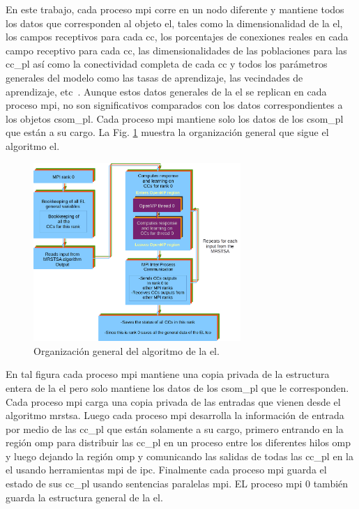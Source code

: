 {En este trabajo, cada proceso \gls{mpi} corre en un nodo diferente y mantiene todos los datos que corresponden al objeto \gls{el}, tales como la dimensionalidad de la \gls{el}, los campos receptivos para cada \gls{cc}, los porcentajes de conexiones reales en cada campo receptivo para cada \gls{cc}, las dimensionalidades de las poblaciones para las \gls{cc_pl} así como la conectividad completa de cada \gls{cc} y todos los parámetros generales del modelo como las tasas de aprendizaje, las vecindades de aprendizaje, etc~\cite{10.1371/journal.pone.0217966}.
Aunque estos datos generales de la \gls{el} se replican en cada proceso \gls{mpi}, no son significativos comparados con los datos correspondientes a los objetos \gls{csom_pl}.
Cada proceso \gls{mpi} mantiene solo los datos de los \gls{csom_pl} que están a su cargo.
La Fig. \ref{fig:EL_ALG} muestra la organización general que sigue el algoritmo \gls{el}.

\begin{figure}[ht]
    \centering
    \includegraphics[width=0.7\textwidth]{EL_ALG.png}
    \caption{Organización general del algoritmo de la \gls{el}.} 
    \label{fig:EL_ALG}
\end{figure}

En tal figura cada proceso \gls{mpi} mantiene una copia privada de la estructura entera de la \gls{el} pero solo mantiene los datos de los \gls{csom_pl} que le corresponden.
Cada proceso \gls{mpi} carga una copia privada de las entradas que vienen desde el algoritmo \gls{mrstsa}.
Luego cada proceso \gls{mpi} desarrolla la información de entrada por medio de las \gls{cc_pl} que están solamente a su cargo, primero entrando en la región \gls{omp} para distribuir las \gls{cc_pl} en un proceso entre los diferentes hilos \gls{omp} y luego dejando la región \gls{omp} y comunicando las salidas de todas las \gls{cc_pl} en la \gls{el} usando herramientas \gls{mpi} de \gls{ipc}.
Finalmente cada proceso \gls{mpi} guarda el estado de sus \gls{cc_pl} usando sentencias paralelas \gls{mpi}.
EL proceso \gls{mpi} 0 también guarda la estructura general de la \gls{el}.
}{
}
